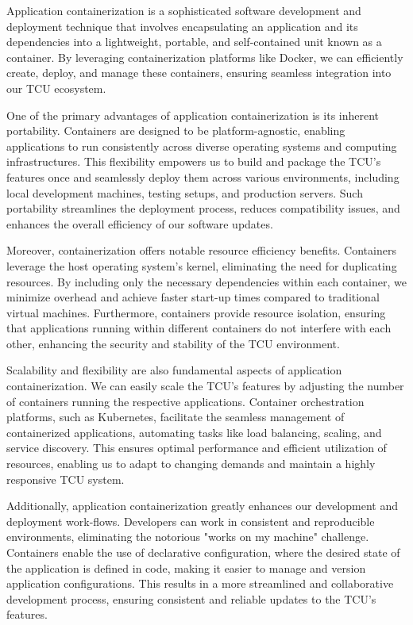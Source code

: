 \documentclass[
12pt,
oneside, 
onehalfspacing, 
nolistspacing, 
parskip, 
chapterinoneline, 
]{AASTCOMPUTER}
\begin{document}
Application containerization is a sophisticated software development and deployment technique that involves encapsulating an application and its dependencies into a lightweight, portable, and self-contained unit known as a container. By leveraging containerization platforms like Docker, we can efficiently create, deploy, and manage these containers, ensuring seamless integration into our TCU ecosystem.

One of the primary advantages of application containerization is its inherent portability. Containers are designed to be platform-agnostic, enabling applications to run consistently across diverse operating systems and computing infrastructures. This flexibility empowers us to build and package the TCU's features once and seamlessly deploy them across various environments, including local development machines, testing setups, and production servers. Such portability streamlines the deployment process, reduces compatibility issues, and enhances the overall efficiency of our software updates.

Moreover, containerization offers notable resource efficiency benefits. Containers leverage the host operating system's kernel, eliminating the need for duplicating resources. By including only the necessary dependencies within each container, we minimize overhead and achieve faster start-up times compared to traditional virtual machines. Furthermore, containers provide resource isolation, ensuring that applications running within different containers do not interfere with each other, enhancing the security and stability of the TCU environment.

Scalability and flexibility are also fundamental aspects of application containerization. We can easily scale the TCU's features by adjusting the number of containers running the respective applications. Container orchestration platforms, such as Kubernetes, facilitate the seamless management of containerized applications, automating tasks like load balancing, scaling, and service discovery. This ensures optimal performance and efficient utilization of resources, enabling us to adapt to changing demands and maintain a highly responsive TCU system.

Additionally, application containerization greatly enhances our development and deployment work-flows. Developers can work in consistent and reproducible environments, eliminating the notorious "works on my machine" challenge. Containers enable the use of declarative configuration, where the desired state of the application is defined in code, making it easier to manage and version application configurations. This results in a more streamlined and collaborative development process, ensuring consistent and reliable updates to the TCU's features.
\end{document}
